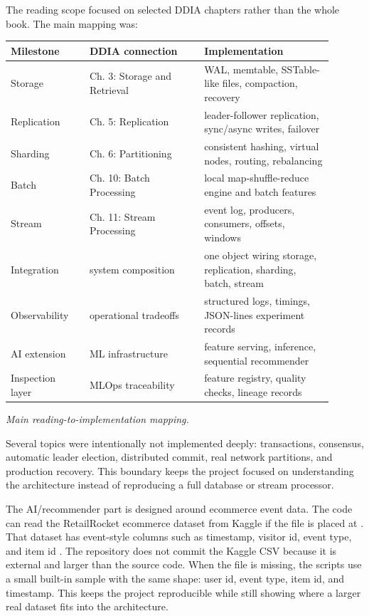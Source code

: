 The reading scope focused on selected DDIA chapters rather than the whole book.
The main mapping was:

\begin{center}
\footnotesize
\setlength{\tabcolsep}{4pt}
\renewcommand{\arraystretch}{0.95}
\begin{tabular}{p{0.22\linewidth} p{0.32\linewidth} p{0.36\linewidth}}
\toprule
\textbf{Milestone} & \textbf{DDIA connection} & \textbf{Implementation} \\
\midrule
Storage & Ch. 3: Storage and Retrieval & WAL, memtable, SSTable-like files, compaction, recovery \\
Replication & Ch. 5: Replication & leader-follower replication, sync/async writes, failover \\
Sharding & Ch. 6: Partitioning & consistent hashing, virtual nodes, routing, rebalancing \\
Batch & Ch. 10: Batch Processing & local map-shuffle-reduce engine and batch features \\
Stream & Ch. 11: Stream Processing & event log, producers, consumers, offsets, windows \\
Integration & system composition & one object wiring storage, replication, sharding, batch, stream \\
Observability & operational tradeoffs & structured logs, timings, JSON-lines experiment records \\
AI extension & ML infrastructure & feature serving, inference, sequential recommender \\
Inspection layer & MLOps traceability & feature registry, quality checks, lineage records \\
\bottomrule
\end{tabular}
\vspace{0.2cm}
\textit{Main reading-to-implementation mapping.}
\end{center}

Several topics were intentionally not implemented deeply: transactions,
consensus, automatic leader election, distributed commit, real network
partitions, and production recovery. This boundary keeps the project focused on
understanding the architecture instead of reproducing a full database or stream
processor.

The AI/recommender part is designed around ecommerce event data. The code can
read the RetailRocket ecommerce dataset from Kaggle if the file is placed at
. That dataset has event-style columns
such as timestamp, visitor id, event type, and item id \cite{retailrocketdataset}.
The repository does not commit the Kaggle CSV because it is external and larger
than the source code. When the file is missing, the scripts use a small built-in
sample with the same shape: user id, event type, item id, and timestamp. This
keeps the project reproducible while still showing where a larger real dataset
fits into the architecture.

